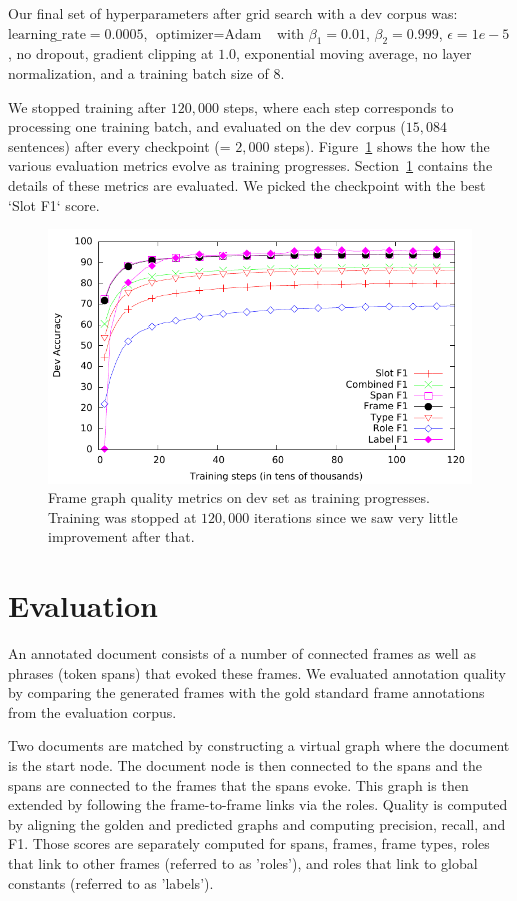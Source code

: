 \documentclass[11pt,a4paper]{article}
\begin{document}
 Our final set of hyperparameters after
grid search with a dev corpus was: $\mbox{learning\_rate} = 0.0005$,
$\mbox{optimizer} = \mbox{Adam}$~\cite{kingma2014} with $\beta_1 = 0.01$, $\beta_2 = 0.999$,
$\epsilon = 1e-5$, no dropout, gradient clipping at $1.0$, exponential moving
average, no layer normalization, and a training batch size of $8$.

We stopped training after $120,000$ steps, where each step corresponds to
processing one training batch, and evaluated on the dev corpus
($15,084$ sentences) after every checkpoint (= $2,000$ steps).
Figure~\ref{fig:dev-eval} shows the how the various evaluation metrics evolve
as training progresses. Section~\ref{sec:eval} contains the details of these
metrics are evaluated. We picked the checkpoint with the best `Slot F1` score.

\begin{figure}
\centering
\includegraphics[width=\columnwidth]{dev-eval.pdf}
  \caption{Frame graph quality metrics on dev set as training progresses.
	Training was stopped at $120,000$ iterations since we saw very little
	improvement after that.}
  \label{fig:dev-eval}
\end{figure}

\section{Evaluation}
\label{sec:eval}

An annotated document consists of a number of connected frames as well as
phrases (token spans) that evoked these frames. We evaluated
annotation quality by comparing the generated frames with the gold standard frame
annotations from the evaluation corpus.

Two documents are matched by constructing a virtual graph where the document
is the start node. The document node is then connected to the spans and the
spans are connected to the frames that the spans evoke. This graph is then
extended by following the frame-to-frame links via the roles. Quality is
computed by aligning the golden and predicted graphs and computing precision,
recall, and F1. Those scores are separately computed for spans, frames,
frame types, roles that link to other frames (referred to as 'roles'),
and roles that link to global constants (referred to as 'labels').
\end{document}
